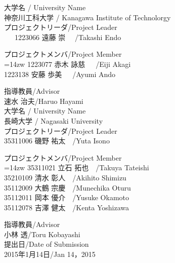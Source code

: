 \begin{center}
\newpage
\thispagestyle{empty}
{\normalsize 大学名 / University Name\\[-1mm]神奈川工科大学 / Kanagawa Institute of Technolorgy}\\[5mm]
{\normalsize プロジェクトリーダ/Project Leader}\\[-1mm]
\ \ \ 1223066 遠藤 崇 \ \ /Takashi Endo\\[10mm]
\begin{center}
プロジェクトメンバ/Project Member\\
\leftskip=14zw
1223077 赤木 詠慈\ \ \ /Eiji Akagi\\
1223138 安藤 歩美\ \ \ /Ayumi Ando\\
\end{center}
指導教員/Advisor\\[-1mm]
速水 治夫/Haruo Hayami\\[10mm]

{\normalsize 大学名 / University Name\\[-1mm]長崎大学 / Nagasaki University}\\[5mm]
{\normalsize プロジェクトリーダ/Project Leader}\\[-1mm]
35311006 磯野 祐太\ \  /Yuta Isono\\[10mm]
\begin{center}
プロジェクトメンバ/Project Member\\
\leftskip=14zw
35311021 立石 拓也\ \ /Takuya Tateishi\\
35210109 清水 彰人\ \ /Akihito Shimizu\\
35112009 大鶴 宗慶\ \ /Munechika Oturu\\
35112011 岡本 優介\ \ /Yusuke Okamoto\\
35112078 吉澤 健太\ \ /Kenta Yoshizawa\\
\end{center}
指導教員/Advisor\\
小林 透/Toru Kobayashi\\[10mm]

提出日/Date of Submission\\
2015年1月14日/Jan 14，2015\\
\end{center}
